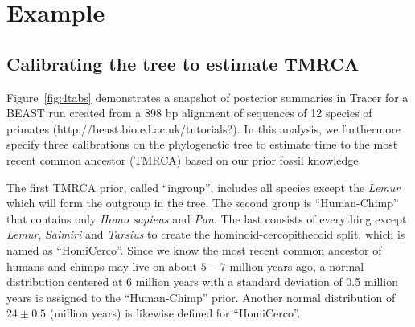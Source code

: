 \documentclass{bioinfo}
\begin{document}

\section*{Example}


\subsection*{Calibrating the tree to estimate TMRCA}

Figure~\ref{fig:4tabs} demonstrates a snapshot of posterior summaries in Tracer for a BEAST \citep{drummond2007beast} run created from a 898 bp alignment of sequences of 12 species of primates (http://beast.bio.ed.ac.uk/tutorials?). %
In this analysis, we furthermore specify three calibrations on the phylogenetic tree to estimate time to the most recent common ancestor (TMRCA) based on our prior fossil knowledge. 

The first TMRCA prior, called ``ingroup'', includes all species except the \textit{Lemur} which will form the outgroup in the tree. %
The second group is ``Human-Chimp'' that contains only \textit{Homo sapiens} and \textit{Pan}. 
The last consists of everything except \textit{Lemur}, \textit{Saimiri} and \textit{Tarsius} to create the hominoid-cercopithecoid split, which is named as ``HomiCerco''. 
Since we know the most recent common ancestor of humans and chimps may live on about $5-7$ million years ago, a normal distribution centered at 6 million years with a standard deviation of 0.5 million years is assigned to the ``Human-Chimp'' prior. 
Another normal distribution of $24 \pm 0.5$ (million years) is likewise defined for ``HomiCerco''.
\end{document}
